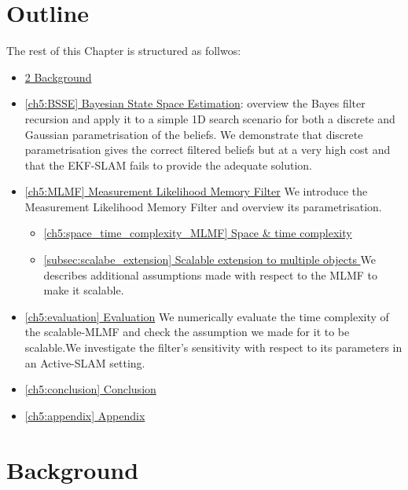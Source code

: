 \section{Outline}


The rest of this Chapter is structured as follwos:


\begin{itemize}
 \item \hyperref[ch5:background]{\ref{ch5:background} Background}

 \item \hyperref[ch5:BSSE]{\ref{ch5:BSSE} Bayesian State Space Estimation}:  overview the Bayes filter recursion and apply it to a simple 
    1D search scenario for both a discrete and Gaussian parametrisation of the beliefs. We demonstrate that discrete parametrisation gives
    the correct filtered beliefs but at a very high cost and that the EKF-SLAM fails to provide the adequate solution.

 \item \hyperref[ch5:MLMF]{\ref{ch5:MLMF} Measurement Likelihood Memory Filter}
 We introduce the Measurement Likelihood Memory Filter and overview its parametrisation.
    \begin{itemize}
     \item \hyperref[ch5:space_time_complexity_MLMF]{\ref{ch5:space_time_complexity_MLMF} Space \& time complexity }
     \item \hyperref[subsec:scalabe_extension]{\ref{subsec:scalabe_extension} Scalable extension to multiple objects }
     We describes additional assumptions made with respect to the MLMF to make it scalable.
    \end{itemize}
 \item \hyperref[ch5:evaluation]{\ref{ch5:evaluation} Evaluation}
 We numerically evaluate the time complexity of the scalable-MLMF and check the assumption we made 
for it to be scalable.We investigate the filter's sensitivity with respect to its parameters in an Active-SLAM setting.
 \item \hyperref[ch5:conclusion]{\ref{ch5:conclusion} Conclusion}
 \item \hyperref[ch5:appendix]{\ref{ch5:appendix} Appendix}
\end{itemize}

\section{Background}\label{ch5:background}

